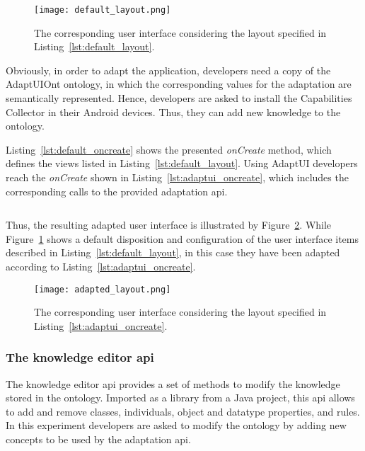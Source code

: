 \inputminted[linenos=true, fontsize=\footnotesize, frame=lines]{xml}{5_experiments_and_results/default_layout.xml}

\inputminted[linenos=true, fontsize=\footnotesize, frame=lines]{java}{5_experiments_and_results/default_oncreate.java}

\begin{figure}
\centering
\texttt{[image: default\_layout.png]}
\caption{The corresponding user interface considering the layout specified in
Listing~\ref{lst:default_layout}.}
\label{fig:default_layout}
\end{figure}

Obviously, in order to adapt the application, developers need a copy of the
AdaptUIOnt ontology, in which the corresponding values for the adaptation are
semantically represented. Hence, developers are asked to install the Capabilities 
Collector in their Android devices. Thus, they can add new knowledge to the ontology.

Listing~\ref{lst:default_oncreate} shows the presented \textit{onCreate} method, 
which defines the views listed in Listing~\ref{lst:default_layout}. Using AdaptUI 
developers reach the \textit{onCreate} shown in Listing~\ref{lst:adaptui_oncreate},
which includes the corresponding calls to the provided adaptation \ac{api}.

\inputminted[linenos=true, fontsize=\footnotesize, frame=lines]{java}{5_experiments_and_results/adaptui_oncreate.java}

Thus, the resulting adapted user interface is illustrated by Figure~\ref{fig:adapted_layout}.
While Figure~\ref{fig:default_layout} shows a default disposition and configuration
of the user interface items described in Listing~\ref{lst:default_layout}, in this
case they have been adapted according to Listing~\ref{lst:adaptui_oncreate}.

\begin{figure}
\centering
\texttt{[image: adapted\_layout.png]}
\caption{The corresponding user interface considering the layout specified in
Listing~\ref{lst:adaptui_oncreate}.}
\label{fig:adapted_layout}
\end{figure}



\subsubsection{The knowledge editor \ac{api}}
\label{sec:knowledge_api}

The knowledge editor \ac{api} provides a set of methods to modify the knowledge
stored in the ontology. Imported as a library from a Java project, this \ac{api}
allows to add and remove classes, individuals, object and datatype properties,
and rules. In this experiment developers are asked to modify the ontology by
adding new concepts to be used by the adaptation \ac{api}.